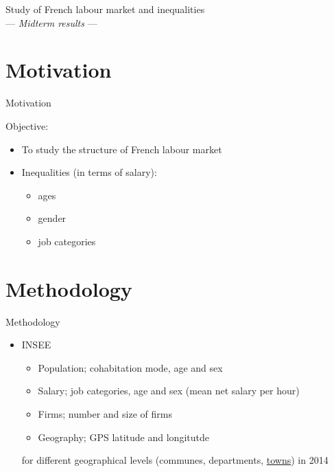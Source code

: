 \documentclass[xcolor=dvipsnames]{beamer}
\title[Topics in Statistical learning]{}
\author{L. Insolia, J. Kim and Y. Yeghikyan}
\institute{SNS}
\date{March 9, 2018}
\begin{document}
	
	\begin{frame}
		\vskip 1.5cm 	
 		\centering\huge\textcolor{bscuro}{Study of French labour market and inequalities} \\
		\vskip 0.5cm 
			\centering\small \textcolor{rscuro}{--- \emph{Midterm results} ---}
			\maketitle
	\end{frame}
	
	
	
\section{Motivation}
		\begin{frame}{\vskip 0.05cm\centerline{\Huge\textcolor{bscuro}{Motivation}}}
			Objective:
			\begin{itemize}
			 	 \item To study the structure of French labour market 
			 	 \item Inequalities (in terms of salary): 
			 	 \begin{itemize}
			 	 	\item ages 
			 	 	\item gender
			 	 	\item job categories
			 	 \end{itemize}
			\end{itemize}
			\vskip 1cm
\end{frame}
	
	
\section{Methodology}
		\begin{frame}{\vskip 0.05cm\centerline{\Huge\textcolor{bscuro}{Methodology}}}
 		\begin{itemize}
			\item INSEE 
				\begin{itemize}
				\item Population; cohabitation mode, age and sex
				\item Salary; job categories, age and sex (mean net salary per hour)
				\item Firms; number and size of firms
				\item Geography; GPS latitude and longitutde
				\end{itemize}
		for different geographical levels (communes, departments, \underline{towns}) in 2014
		\end{itemize}				
\end{frame}
	
\end{document}
